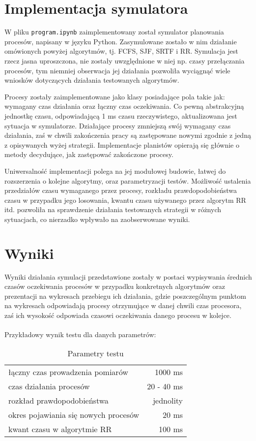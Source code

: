 \documentclass{article}
\begin{document}
\section{Implementacja symulatora}

W pliku \texttt{program.ipynb} zaimplementowany został symulator planowania procesów, napisany w języku Python.
Zasymulowane zostało w nim działanie omówionych powyżej algorytmów, tj. FCFS, SJF, SRTF i RR.
Symulacja jest rzecz jasna uproszczona, nie zostały uwzględnione w niej np. czasy przełączania procesów,
tym niemniej obserwacja jej działania pozwoliła wyciągnąć wiele wniosków dotyczących działania testowanych algorytmów.

Procesy zostały zaimplementowane jako klasy posiadające pola takie jak:
wymagany czas działania oraz łączny czas oczekiwania.
Co pewną abstrakcyjną jednostkę czasu, odpowiadającą 1 ms czasu rzeczywistego,
aktualizowana jest sytuacja w symulatorze.
Działające procesy zmniejszą swój wymagany czas działania,
zaś w chwili zakończenia pracy są zastępowane nowymi zgodnie z jedną z opisywanych wyżej strategii.
Implementacje planistów opierają się głównie o metody decydujące, jak zastępować zakończone procesy.

Uniwersalność implementacji polega na jej modułowej budowie,
łatwej do rozszerzenia o kolejne algorytmy,
oraz parametryzacji testów.
Możliwość ustalenia przedziałów czasu wymaganego przez procesy,
rozkładu prawdopodobieństwa czasu w przypadku jego losowania,
kwantu czasu używanego przez algorytm RR itd.
pozwoliła na sprawdzenie działania testowanych strategii w różnych sytuacjach,
co nierzadko wpływało na zaobserwowane wyniki.

\section{Wyniki}

Wyniki działania symulacji przedstawione zostały
w postaci wypisywania średnich czasów oczekiwania procesów w przypadku konkretnych algorytmów
oraz prezentacji na wykresach przebiegu ich działania,
gdzie poszczególnym punktom na wykresach odpowiadają procesy otrzymujące w danej chwili czas procesora,
zaś ich wysokość odpowiada czasowi oczekiwania danego procesu w kolejce.
\\
\\
Przykładowy wynik testu dla danych parametrów:
\\
\begin{table}[h]
    \centering
    \begin{tabular}{|l|r|}
        \hline
        łączny czas prowadzenia pomiarów & 1000 ms \\
        czas działania procesów & 20 - 40 ms \\
        rozkład prawdopodobieństwa & jednolity \\
        okres pojawiania się nowych procesów & 20 ms \\
        kwant czasu w algorytmie RR & 100 ms \\
        \hline
    \end{tabular}
    \caption{Parametry testu}
    \label{tab:test1param}
\end{table}
\end{document}
